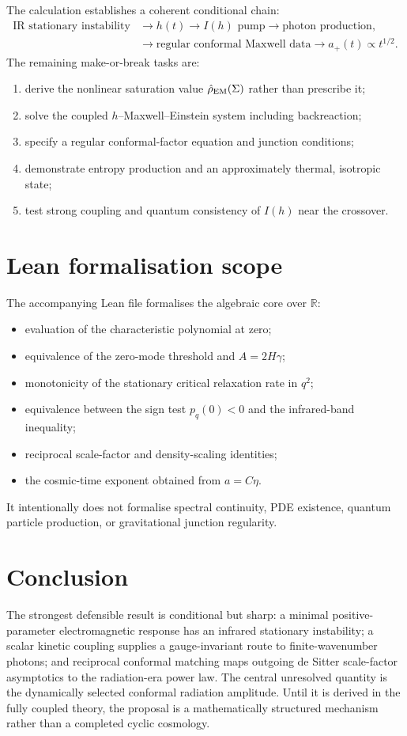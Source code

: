 \documentclass[11pt]{article}
\newcommand{\R}{\mathbb{R}}
\begin{document}
The calculation establishes a coherent conditional chain:
\begin{align*}
\text{IR stationary instability}&\longrightarrow h(t)
\longrightarrow I(h)\text{ pump}\longrightarrow\text{photon production},\\
&\longrightarrow\text{regular conformal Maxwell data}
\longrightarrow a_+(t)\propto t^{1/2}.
\end{align*}
The remaining make-or-break tasks are:
\begin{enumerate}
\item derive the nonlinear saturation value $\hat\rho_{\rm EM}(\Sigma)$ rather than prescribe it;
\item solve the coupled $h$--Maxwell--Einstein system including backreaction;
\item specify a regular conformal-factor equation and junction conditions;
\item demonstrate entropy production and an approximately thermal, isotropic state;
\item test strong coupling and quantum consistency of $I(h)$ near the crossover.
\end{enumerate}

\section{Lean formalisation scope}

The accompanying Lean file formalises the algebraic core over $\R$:
\begin{itemize}
\item evaluation of the characteristic polynomial at zero;
\item equivalence of the zero-mode threshold and $A=2H\gamma$;
\item monotonicity of the stationary critical relaxation rate in $q^2$;
\item equivalence between the sign test $p_q(0)<0$ and the infrared-band inequality;
\item reciprocal scale-factor and density-scaling identities;
\item the cosmic-time exponent obtained from $a=C\eta$.
\end{itemize}
It intentionally does not formalise spectral continuity, PDE existence, quantum particle production, or gravitational junction regularity.

\section*{Conclusion}

The strongest defensible result is conditional but sharp: a minimal positive-parameter electromagnetic response has an infrared stationary instability; a scalar kinetic coupling supplies a gauge-invariant route to finite-wavenumber photons; and reciprocal conformal matching maps outgoing de Sitter scale-factor asymptotics to the radiation-era power law.  The central unresolved quantity is the dynamically selected conformal radiation amplitude.  Until it is derived in the fully coupled theory, the proposal is a mathematically structured mechanism rather than a completed cyclic cosmology.
\end{document}
